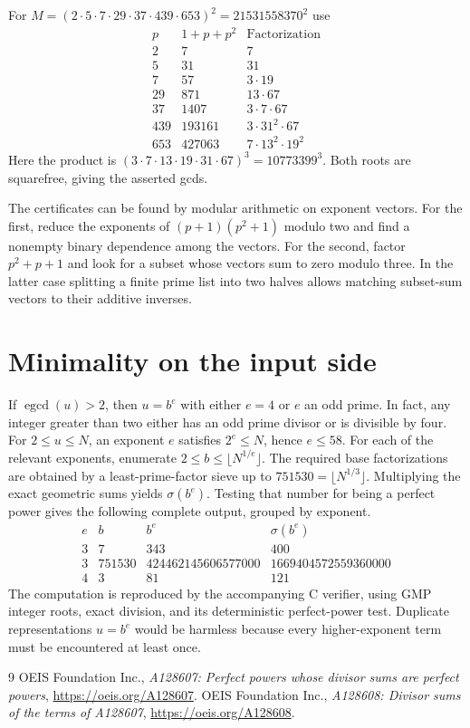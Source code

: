\documentclass[11pt]{article}
\newcommand{\egcd}{\operatorname{egcd}}
\begin{document}
For $M=(2\cdot5\cdot7\cdot29\cdot37\cdot439\cdot653)^2=21531558370^2$
use
\[
\begin{array}{r|r|l}
p & 1+p+p^2 & \text{Factorization}\\ \hline
2 & 7 & 7\\
5 & 31 & 31\\
7 & 57 & 3\cdot19\\
29 & 871 & 13\cdot67\\
37 & 1407 & 3\cdot7\cdot67\\
439 & 193161 & 3\cdot31^2\cdot67\\
653 & 427063 & 7\cdot13^2\cdot19^2
\end{array}
\]
Here the product is $(3\cdot7\cdot13\cdot19\cdot31\cdot67)^3=10773399^3$.
Both roots are squarefree, giving the asserted gcds.

The certificates can be found by modular arithmetic on exponent vectors.
For the first, reduce the exponents of $(p+1)(p^2+1)$ modulo two and
find a nonempty binary dependence among the vectors. For the second,
factor $p^2+p+1$ and look for a subset whose vectors sum to zero modulo
three. In the latter case splitting a finite prime list into two halves
allows matching subset-sum vectors to their additive inverses.

\section{Minimality on the input side}

If $\egcd(u)>2$, then $u=b^e$ with either $e=4$ or $e$ an odd
prime. In fact, any integer greater than two either has an odd prime
divisor or is divisible by four. For $2\leq u\leq N$, an exponent $e$
satisfies $2^e\leq N$, hence $e\leq58$. For each of the relevant exponents,
enumerate $2\leq b\leq\lfloor N^{1/e}\rfloor$. The required base
factorizations are obtained by a least-prime-factor sieve up to
$751530=\lfloor N^{1/3}\rfloor$. Multiplying the exact geometric
sums yields $\sigma(b^e)$. Testing that number for being a perfect power
gives the following complete output, grouped by exponent.
\[
\begin{array}{r|r|r|r}
e & b & b^e & \sigma(b^e)\\ \hline
3 & 7 & 343 & 400\\
3 & 751530 & 424462145606577000 & 1669404572559360000\\
4 & 3 & 81 & 121
\end{array}
\]
The computation is reproduced by the accompanying C verifier, using
GMP integer roots, exact division, and its deterministic perfect-power
test. Duplicate representations $u=b^e$ would be harmless because every
higher-exponent term must be encountered at least once.

\begin{thebibliography}{9}
OEIS Foundation Inc., \emph{A128607: Perfect powers whose divisor sums are
perfect powers}, \url{https://oeis.org/A128607}.
OEIS Foundation Inc., \emph{A128608: Divisor sums of the terms of A128607},
\url{https://oeis.org/A128608}.
\end{thebibliography}
\end{document}
